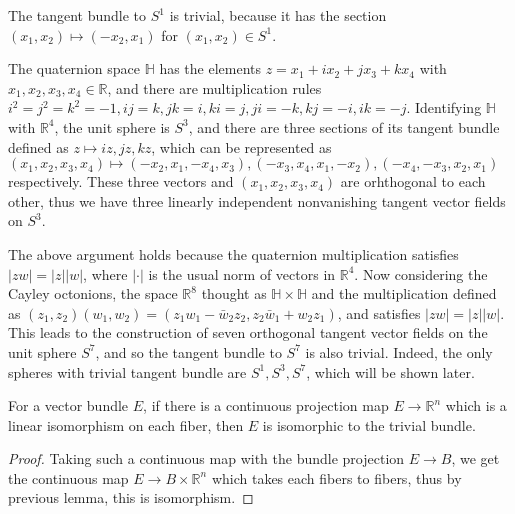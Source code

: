 \begin{exmp} The tangent bundle to $S^1$ is trivial, because it has the section $(x_1,x_2)\mapsto (-x_2,x_1)$ for $(x_1,x_2)\in S^1$.
\end{exmp}

\begin{exmp}[Quaternions] The quaternion space $\mathbb{H}$ has the elements $z=x_1+ix_2+jx_3+kx_4$ with $x_1,x_2,x_3,x_4\in \mathbb{R}$, and there are multiplication rules $i^2=j^2=k^2=-1, ij=k, jk=i,ki=j,ji=-k,kj=-i,ik=-j$. Identifying $\mathbb{H}$ with $\mathbb{R}^4$, the unit sphere is $S^3$, and there are three sections of its tangent bundle defined as $z\mapsto iz, jz, kz$, which can be represented as $(x_1,x_2,x_3,x_4)\mapsto (-x_2,x_1,-x_4,x_3),(-x_3,x_4,x_1,-x_2), (-x_4,-x_3,x_2,x_1)$ respectively. These three vectors and $(x_1,x_2,x_3,x_4)$ are orhthogonal to each other, thus we have three linearly independent nonvanishing tangent vector fields on $S^3$.
\end{exmp}

\begin{exmp} The above argument holds because the quaternion multiplication satisfies $|zw|=|z||w|$, where $|\cdot |$ is the usual norm of vectors in $\mathbb{R}^4$. Now considering the Cayley octonions, the space $\mathbb{R}^8$ thought as $\mathbb{H}\times \mathbb{H}$ and the multiplication defined as $(z_1,z_2)(w_1,w_2)=(z_1w_1-\bar{w}_2 z_2,z_2\bar{w}_1+w_2z_1)$, and satisfies $|zw|=|z||w|$. This leads to the construction of seven orthogonal tangent vector fields on the unit sphere $S^7$, and so the tangent bundle to $S^7$ is also trivial. Indeed, the only spheres with trivial tangent bundle are $S^1, S^3, S^7$, which will be shown later.
\end{exmp}

\begin{cor} For a vector bundle $E$, if there is a continuous projection map $E\rightarrow \mathbb{R}^n$ which is a linear isomorphism on each fiber, then $E$ is isomorphic to the trivial bundle.
\end{cor}
\begin{proof}
Taking such a continuous map with the bundle projection $E\rightarrow B$, we get the continuous map $E\rightarrow B\times \mathbb{R}^n$ which takes each fibers to fibers, thus by previous lemma, this is isomorphism.
\end{proof}

